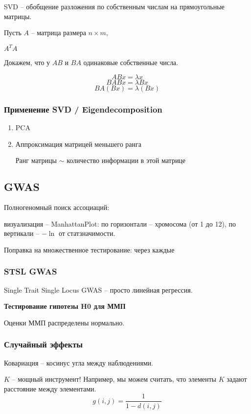 \documentclass[main.tex]{subfiles}
\begin{document}
SVD -- обобщение разложения по собственным числам на прямоугольные матрицы.

Пусть $ A $ -- матрица размера $ n \times m $,

$ A^T A $ %

Докажем, что у $ AB $ и $ BA $ одинаковые собственные числа.

\[ ABx = \lambda x \]
\[ BABx = \lambda Bx \]
\[ BA(Bx) = \lambda (Bx) \]

\subsubsection{Применение SVD / Eigendecomposition}

\begin{enumerate}[noitemsep]
	\item PCA
	\item Аппроксимация матрицей меньшего ранга
	
	Ранг матрицы $ \sim $ количество информации в этой матрице
\end{enumerate}

\subsection{ GWAS }

Полногеномный поиск ассоциаций:

визуализация -- ManhattanPlot:
по горизонтали -- хромосома (от 1 до 12), по вертикали -- $ - \ln $ от статзначимости.

Поправка на множественное тестирование:
через каждые

\subsubsection{STSL GWAS}
Single Trait Single Locus GWAS -- просто линейная регрессия.

\textbf{ Тестирование гипотезы H0 для ММП }

Оценки ММП распределены нормально.

\subsubsection{ Случайный эффекты }

Ковариация -- косинус угла между наблюдениями.

$ K $ -- мощный инструмент!
Например, мы можем считать, что элементы $ K $ задают расстояние между элементами.
\[ g(i,j) = \frac{1}{ 1 - d(i,j) } \]
\end{document}
